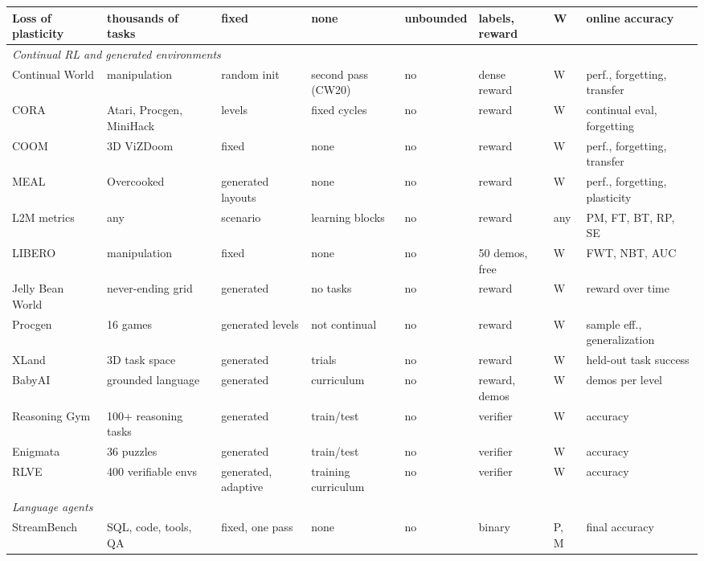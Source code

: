 \begin{table}
\begin{adjustbox}{max width=\textheight}
\begin{tabular}{llllllll}
Loss of plasticity \citep{dohare2024loss} & thousands of tasks & fixed & none & unbounded & labels, reward & W & online accuracy \\
\midrule
\multicolumn{8}{l}{\emph{Continual RL and generated environments}} \\
Continual World \citep{wolczyk2021continual} & manipulation & random init & second pass (CW20) & no & dense reward & W & perf., forgetting, transfer \\
CORA \citep{powers2022cora} & Atari, Procgen, MiniHack & levels & fixed cycles & no & reward & W & continual eval, forgetting \\
COOM \citep{tomilin2023coom} & 3D ViZDoom & fixed & none & no & reward & W & perf., forgetting, transfer \\
MEAL \citep{tomilin2026meal} & Overcooked & generated layouts & none & no & reward & W & perf., forgetting, plasticity \\
L2M metrics \citep{new2022lifelong} & any & scenario & learning blocks & no & reward & any & PM, FT, BT, RP, SE \\
LIBERO \citep{liu2023libero} & manipulation & fixed & none & no & 50 demos, free & W & FWT, NBT, AUC \\
Jelly Bean World \citep{platanios2020jelly} & never-ending grid & generated & no tasks & no & reward & W & reward over time \\
Procgen \citep{cobbe2020procgen} & 16 games & generated levels & not continual & no & reward & W & sample eff., generalization \\
XLand \citep{oel2021xland,ada2023humantimescale} & 3D task space & generated & trials & no & reward & W & held-out task success \\
BabyAI \citep{chevalierboisvert2019babyai} & grounded language & generated & curriculum & no & reward, demos & W & demos per level \\
Reasoning Gym \citep{stojanovski2025reasoninggym} & 100+ reasoning tasks & generated & train/test & no & verifier & W & accuracy \\
Enigmata \citep{chen2025enigmata} & 36 puzzles & generated & train/test & no & verifier & W & accuracy \\
RLVE \citep{zeng2026rlve} & 400 verifiable envs & generated, adaptive & training curriculum & no & verifier & W & accuracy \\
\midrule
\multicolumn{8}{l}{\emph{Language agents}} \\
StreamBench \citep{wu2024streambench} & SQL, code, tools, QA & fixed, one pass & none & no & binary & P, M & final accuracy \\

\end{tabular}
\end{adjustbox}
\end{table}
